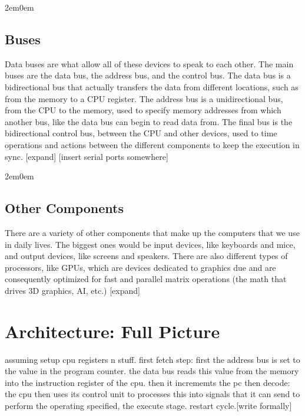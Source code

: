 \documentclass[openany, 12px]{book}
\begin{document}
\begin{adjustwidth}{2em}{0em}
\subsection{Buses}
Data buses are what allow all of these devices to speak to each other. The main buses are the data bus, the address bus, and the control bus. The data bus is a bidirectional bus that actually transfers the data from different locations, such as from the memory to a CPU register. The address bus is a unidirectional bus, from the CPU to the memory, used to specify memory addresses from which another bus, like the data bus can begin to read data from. The final bus is the bidirectional control bus, between the CPU and other devices, used to time operations and actions between the different components to keep the execution in sync. [expand] [insert serial ports somewhere]
\end{adjustwidth}

\begin{adjustwidth}{2em}{0em}
\subsection{Other Components} 
There are a variety of other components that make up the computers that we use in daily lives. The biggest ones would be input devices, like keyboards and mice, and output devices, like screens and speakers. There are also different types of processors, like GPUs, which are devices dedicated to graphics due and are consequently optimized for fast and parallel matrix operations (the math that drives 3D graphics, AI, etc.) [expand]
\end{adjustwidth}

\section{Architecture: Full Picture}
assuming setup cpu registers n stuff. first fetch step: first the address bus is set to the value in the program counter. the data bus reads this value from the memory into the instruction register of the cpu. then it incrememts the pc then decode: the cpu then uses its control unit to processes this into signals that it can send to perform the operating specified, the execute stage. restart cycle.[write formally]
\end{document}
